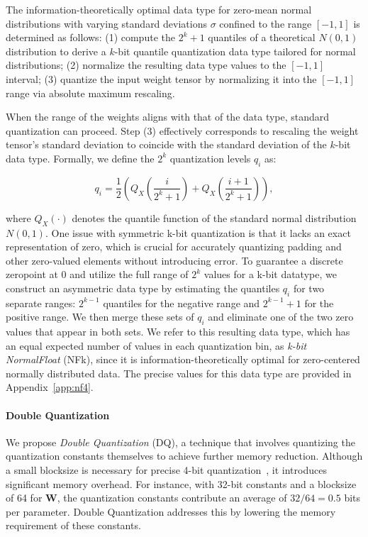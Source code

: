 The information-theoretically optimal data type for zero-mean normal distributions with varying standard deviations $\sigma$ confined to the range $[-1, 1]$ is determined as follows: (1) compute the $2^k+1$ quantiles of a theoretical $N(0, 1)$ distribution to derive a $k$-bit quantile quantization data type tailored for normal distributions; (2) normalize the resulting data type values to the $[-1, 1]$ interval; (3) quantize the input weight tensor by normalizing it into the $[-1, 1]$ range via absolute maximum rescaling.

When the range of the weights aligns with that of the data type, standard quantization can proceed. Step (3) effectively corresponds to rescaling the weight tensor’s standard deviation to coincide with the standard deviation of the $k$-bit data type. Formally, we define the $2^k$ quantization levels $q_i$ as:

\begin{equation}
q_i  = \frac{1}{2}\left( Q_X\left(\frac{i}{2^k+1}\right) + Q_X\left(\frac{i+1}{2^k+1}\right)\right),
\end{equation}

where $Q_X(\cdot)$ denotes the quantile function of the standard normal distribution $N(0,1)$. One issue with symmetric k-bit quantization is that it lacks an exact representation of zero, which is crucial for accurately quantizing padding and other zero-valued elements without introducing error. To guarantee a discrete zeropoint at $0$ and utilize the full range of $2^k$ values for a k-bit datatype, we construct an asymmetric data type by estimating the quantiles $q_i$ for two separate ranges: $2^{k-1}$ quantiles for the negative range and $2^{k-1}+1$ for the positive range. We then merge these sets of $q_i$ and eliminate one of the two zero values that appear in both sets. We refer to this resulting data type, which has an equal expected number of values in each quantization bin, as \emph{k-bit NormalFloat} (NFk), since it is information-theoretically optimal for zero-centered normally distributed data. The precise values for this data type are provided in Appendix~\ref{app:nf4}.

\paragraph{Double Quantization{}} 
We propose \emph{Double Quantization} (DQ), a technique that involves quantizing the quantization constants themselves to achieve further memory reduction. Although a small blocksize is necessary for precise 4-bit quantization~\citep{dettmers2022case}, it introduces significant memory overhead. For instance, with 32-bit constants and a blocksize of 64 for $\mathbf{W}$, the quantization constants contribute an average of $32/64 = 0.5$ bits per parameter. Double Quantization addresses this by lowering the memory requirement of these constants.

